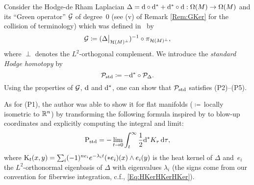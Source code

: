 \documentclass[\MainFolder/Text.tex]{subfiles}
\begin{document}
\begin{Remark}
Consider the Hodge-de Rham Laplacian $\Delta = \mathrm{d} \circ \mathrm{d}^* + \mathrm{d}^* \circ \mathrm{d} : \Omega(M) \rightarrow \Omega(M)$ and its ``Green operator'' $\operatorname{\mathcal{G}}$ of degree~$0$ (see (v) of Remark \ref{Rem:GKer} for the collision of terminology) which was defined in~\cite[Definition~6.9]{Warner1983} by
$$\GOp \coloneqq (\Restr{\Delta}{\Harm(M)^{\perp}})^{-1} \circ \pi_{\Harm(M)^\perp}, $$
where $\perp$ denotes the $L^2$-orthogonal complement. We introduce the \emph{standard Hodge homotopy} by
\begin{equation}\label{Eq:GStdStd}
\mathcal{P}_{\mathrm{std}} \coloneqq -\mathrm{d}^*\circ \mathcal{P}_{\Delta}.
\end{equation}
Using the properties of $\operatorname{\mathcal{G}}$, $\mathrm{d}$ and $\mathrm{d}^*$, one can show that $\mathcal{P}_{\mathrm{std}}$ satisfies (P2)--(P5).

As for (P1), the author was able to show it for flat manifolds ($\coloneqq$\,locally isometric to $\mathbb{R}^n$) by transforming the following formula inspired by \cite{Harris2004} to blow-up coordinates and explicitly computing the integral and limit:
$$ \mathrm{P}_{\mathrm{std}} = - \lim_{t\to 0} \int_t^\infty \frac{1}{2}\mathrm{d}^* K_\tau \operatorname{d\tau}, $$
where $\mathrm{K}_t(x,y) = \sum_i (-1)^{n e_i} e^{-\lambda_i t} (* e_i)(x) \wedge e_i(y)$ is the heat kernel of $\Delta$ and~$e_i$ the $L^2$-orthonormal eigenbasis of $\Delta$ with eigenvalues $\lambda_i$ (the signs come from our convention for fiberwise integration, c.f., \eqref{Eq:HKerHKerHKer}).
%
\end{Remark}
\end{document}
